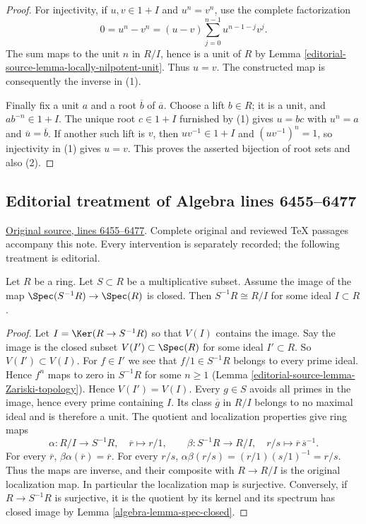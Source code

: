 \begin{proof}
\medskip\noindent
For injectivity, if $u,v\in1+I$ and $u^n=v^n$, use the complete
factorization
$$
0=u^n-v^n=(u-v)\sum_{j=0}^{n-1}u^{n-1-j}v^j.
$$
The sum maps to the unit $n$ in $R/I$, hence is a unit of $R$ by
Lemma \ref{editorial-source-lemma-locally-nilpotent-unit}. Thus $u=v$.
The constructed map is consequently the inverse in (1).

\medskip\noindent
Finally fix a unit $a$ and a root $\overline b$ of $\overline a$.
Choose a lift $b\in R$; it is a unit, and $ab^{-n}\in1+I$.
The unique root $c\in1+I$ furnished by (1) gives $u=bc$ with
$u^n=a$ and $\overline u=\overline b$.
If another such lift is $v$, then $uv^{-1}\in1+I$ and
$(uv^{-1})^n=1$, so injectivity in (1) gives $u=v$.
This proves the asserted bijection of root sets and also (2).
\end{proof}


\subsection{Editorial treatment of Algebra lines 6455--6477}

\hypertarget{algebra-context-052}{}

\noindent\href{https://github.com/stacks/stacks-project/blob/a04446e57ec1fbc252a871afcec7752fb2807b14/algebra.tex\#L6455}{Original source, lines 6455--6477}. Complete original and reviewed TeX passages accompany this note. Every intervention is separately recorded; the following treatment is editorial.


\begin{lemma}
\label{editorial-source-lemma-invert-closed-quotient}
Let $R$ be a ring. Let $S \subset R$ be a multiplicative subset.
Assume the image of the map $\Spec(S^{-1}R) \to \Spec(R)$
is closed. Then $S^{-1}R \cong R/I$ for some ideal $I \subset R$.
\end{lemma}

\begin{proof}
Let $I = \Ker(R \to S^{-1}R)$ so that $V(I)$ contains the image.
Say the image is the closed subset $V(I') \subset \Spec(R)$ for
some ideal $I' \subset R$. So $V(I') \subset V(I)$.
For $f \in I'$ we see that $f/1 \in S^{-1}R$
belongs to every prime ideal. Hence $f^n$ maps to zero in $S^{-1}R$
for some $n \geq 1$ (Lemma \ref{editorial-source-lemma-Zariski-topology}).
Hence $V(I') = V(I)$.
Every $g\in S$ avoids all primes in the image, hence every prime
containing $I$. Its class $\overline g$ in $R/I$ belongs to no maximal
ideal and is therefore a unit. The quotient and localization properties
give ring maps
$$
\alpha:R/I\longrightarrow S^{-1}R,\quad \overline r\longmapsto r/1,
\qquad
\beta:S^{-1}R\longrightarrow R/I,\quad r/s\longmapsto
\overline r\,\overline s^{-1}.
$$
For every $\overline r$, $\beta\alpha(\overline r)=\overline r$.
For every $r/s$, $\alpha\beta(r/s)=(r/1)(s/1)^{-1}=r/s$.
Thus the maps are inverse, and their composite with $R\to R/I$
is the original localization map. In particular the localization map
is surjective. Conversely, if $R\to S^{-1}R$ is surjective, it is
the quotient by its kernel and its spectrum has closed image by
Lemma \ref{algebra-lemma-spec-closed}.
\end{proof}


